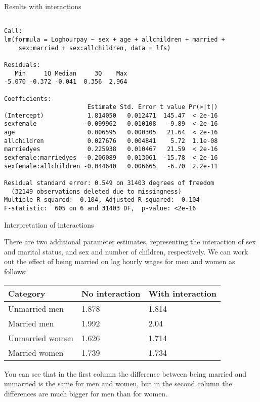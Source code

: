 \documentclass[10pt,ignorenonframetext,]{beamer}
\begin{document}
\begin{frame}[fragile]{Results with interactions}

\footnotesize

\begin{verbatim}

Call:
lm(formula = Loghourpay ~ sex + age + allchildren + married +
    sex:married + sex:allchildren, data = lfs)

Residuals:
   Min     1Q Median     3Q    Max
-5.070 -0.372 -0.041  0.356  2.964

Coefficients:
                       Estimate Std. Error t value Pr(>|t|)
(Intercept)            1.814050   0.012471  145.47  < 2e-16
sexfemale             -0.099962   0.010108   -9.89  < 2e-16
age                    0.006595   0.000305   21.64  < 2e-16
allchildren            0.027676   0.004841    5.72  1.1e-08
marriedyes             0.225938   0.010467   21.59  < 2e-16
sexfemale:marriedyes  -0.206089   0.013061  -15.78  < 2e-16
sexfemale:allchildren -0.044640   0.006665   -6.70  2.2e-11

Residual standard error: 0.549 on 31403 degrees of freedom
  (32149 observations deleted due to missingness)
Multiple R-squared:  0.104, Adjusted R-squared:  0.104
F-statistic:  605 on 6 and 31403 DF,  p-value: <2e-16
\end{verbatim}

\end{frame}

\begin{frame}{Interpretation of interactions}

There are two additional parameter estimates, representing the
interaction of sex and marital status, and sex and number of children,
respectively. We can work out the effect of being married on log hourly
wages for men and women as follows:

\begin{longtable}[]{@{}lll@{}}
\toprule
Category & No interaction & With interaction\tabularnewline
\midrule
\endhead
Unmarried men & 1.878 & 1.814\tabularnewline
Married men & 1.992 & 2.04\tabularnewline
Unmarried women & 1.626 & 1.714\tabularnewline
Married women & 1.739 & 1.734\tabularnewline
\bottomrule
\end{longtable}

You can see that in the first column the difference between being
married and unmarried is the same for men and women, but in the second
column the differences are much bigger for men than for women.

\end{frame}
\end{document}

